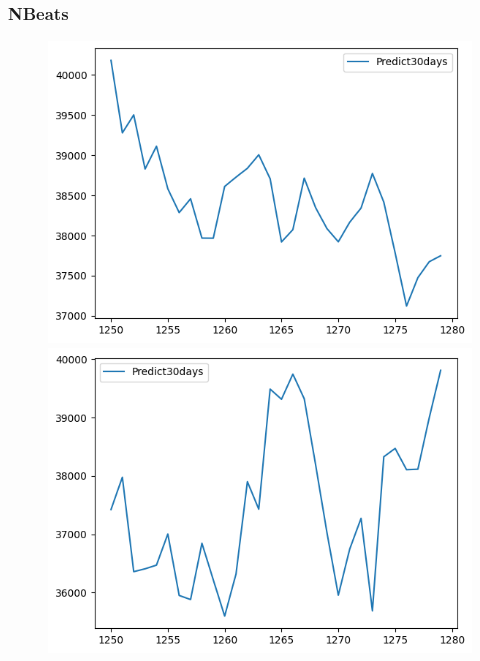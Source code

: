 \subsubsection{NBeats}
\begin{figure}[H]
    \centering
    \begin{minipage}{0.15\textwidth}
    \centering
    \includegraphics[width=1\textwidth]{resources/chapter-5/predicted/BIDV_NBeats_7-3_30days.png}
    \end{minipage}
    \hfill
    \begin{minipage}{0.15\textwidth}
    \centering
    \includegraphics[width=1\textwidth]{resources/chapter-5/predicted/BIDV_NBeats_8-2_30days.png}
    \end{minipage}
    \hfill
        \begin{minipage}{0.15\textwidth}

\end{minipage}
\end{figure}
